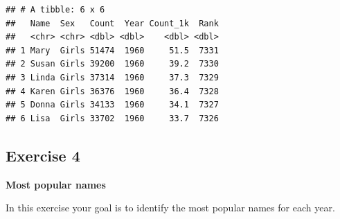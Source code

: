 \documentclass[
]{book}
\begin{document}
\begin{verbatim}
## # A tibble: 6 x 6
##   Name  Sex   Count  Year Count_1k  Rank
##   <chr> <chr> <dbl> <dbl>    <dbl> <dbl>
## 1 Mary  Girls 51474  1960     51.5  7331
## 2 Susan Girls 39200  1960     39.2  7330
## 3 Linda Girls 37314  1960     37.3  7329
## 4 Karen Girls 36376  1960     36.4  7328
## 5 Donna Girls 34133  1960     34.1  7327
## 6 Lisa  Girls 33702  1960     33.7  7326
\end{verbatim}

\hypertarget{exercise-4}{%
\subsection{Exercise 4}\label{exercise-4}}

\textbf{Most popular names}

In this exercise your goal is to identify the most popular names for each year.
\end{document}
